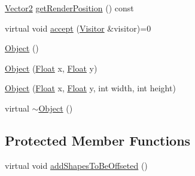 \begin{DoxyCompactItemize}
\item 
\hyperlink{classZeta_1_1Vector2}{Vector2} \hyperlink{classZeta_1_1Object_acc13e1e951de1a2ef39d2f6c3947ecea}{get\+Render\+Position} () const 
\item 
virtual void \hyperlink{classZeta_1_1Object_ab89312e192868609f745c27748a2e669}{accept} (\hyperlink{classZeta_1_1Visitor}{Visitor} \&visitor)=0
\item 
\hyperlink{classZeta_1_1Object_abdbdcc04e7784e844794eae8bfd99afc}{Object} ()
\item 
\hyperlink{classZeta_1_1Object_af5a4fb4a9ed915a42d6b498f498b90b0}{Object} (\hyperlink{namespaceZeta_a1e0a1265f9b3bd3075fb0fabd39088ba}{Float} x, \hyperlink{namespaceZeta_a1e0a1265f9b3bd3075fb0fabd39088ba}{Float} y)
\item 
\hyperlink{classZeta_1_1Object_a737426c6f8f2873efef20d9bf88777d3}{Object} (\hyperlink{namespaceZeta_a1e0a1265f9b3bd3075fb0fabd39088ba}{Float} x, \hyperlink{namespaceZeta_a1e0a1265f9b3bd3075fb0fabd39088ba}{Float} y, int width, int height)
\item 
virtual \hyperlink{classZeta_1_1Object_ab1a13ba4fe0675c4d5ca1835adb05cad}{$\sim$\+Object} ()
\end{DoxyCompactItemize}
\subsection*{Protected Member Functions}
\begin{DoxyCompactItemize}
\item 
virtual void \hyperlink{classZeta_1_1Object_ace7bd18a2fec07bf94fd0fcc4cf9163c}{add\+Shapes\+To\+Be\+Offseted} ()
\end{DoxyCompactItemize}
